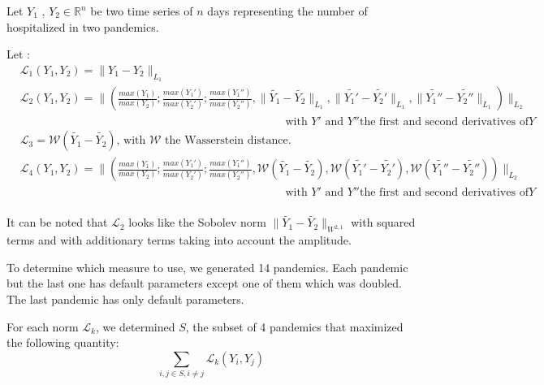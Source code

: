 Let $Y_1$ ,  $Y_2 \in \mathbb{R}^n$  be two time series of $n$ days representing the number of hospitalized in two pandemics.  

Let :  \\

$
\begin{aligned}
    &\mathcal{L}_1(Y_1, Y_2) = \| Y_1 - Y_2 \|_{L_1}  \\
    &\mathcal{L}_2(Y_1, Y_2) = \| (\frac{max(Y_1)}{max(Y_2)} ;\frac{max(Y_1')}{max(Y_2')} ; \frac{max(Y_1'')}{max(Y_2'')} , \| \tilde{Y_1} - \tilde{Y_2} \|_{L_1}, \| \tilde{Y_1'} - \tilde{Y_2'} \|_{L_1} , \| \tilde{Y_1''} - \tilde{Y_2''} \|_{L_1} ) \|_{L_2} \\
    &\quad \quad\quad\quad\quad \quad\quad\quad \quad\quad\quad\quad \quad\quad\quad\quad \quad\quad\quad\quad \quad\quad\quad\text{ with }Y' \text{ and } Y'' \text{the first and second derivatives of} Y\\
    &\mathcal{L}_3 = \mathcal{W}(\tilde{Y_1} - \tilde{Y_2}) \text{, with }\mathcal{W} \text{ the Wasserstein distance.} \\
    &\mathcal{L}_4(Y_1, Y_2) = \| (\frac{max(Y_1)}{max(Y_2)} ;\frac{max(Y_1')}{max(Y_2')} ; \frac{max(Y_1'')}{max(Y_2'')} , \mathcal{W} (\tilde{Y_1} - \tilde{Y_2} ),\mathcal{W} ( \tilde{Y_1'} - \tilde{Y_2'} ) , \mathcal{W} (\tilde{Y_1''} - \tilde{Y_2''} ) ) \|_{L_2} \\
    &\quad \quad\quad\quad\quad \quad\quad\quad \quad\quad\quad\quad \quad\quad\quad\quad \quad\quad\quad\quad \quad\quad\quad\text{ with }Y' \text{ and } Y'' \text{the first and second derivatives of} Y\\[1cm]
\end{aligned}
$

It can be noted that $\mathcal{L}_2$ looks like the Sobolev norm  $\| \tilde{Y_1}  - \tilde{Y_2} \|_{W^{2, 1}} $ with squared terms and with additionary terms taking into account the amplitude. 

To determine which measure to use, we generated 14 pandemics. 
Each pandemic but the last one has default parameters except one of them which was doubled. 
The last pandemic has only default parameters. 

For each norm $\mathcal{L}_k$, we determined $S$,  the subset of 4 pandemics that maximized the following quantity:\\

\[ \sum_{i, j \in S, i \neq j} \mathcal{L}_k(Y_i, Y_j) \]

